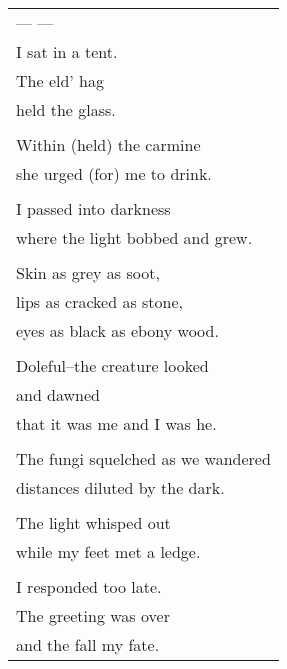 \documentclass{article}
\begin{document}
\begin{tabular}{l}
\\
--- --- \\
I sat in a tent. \\
The eld' hag \\
held the glass. \\
\\
Within (held) the carmine \\
she urged (for) me to drink. \\
\\
I passed into darkness \\
where the light bobbed and grew. \\
\\
Skin as grey as soot, \\
lips as cracked as stone, \\
eyes as black as ebony wood. \\
\\
Doleful--the creature looked \\
and dawned \\
that it was me and I was he. \\
\\
The fungi squelched as we wandered \\
distances diluted by the dark. \\
\\
The light whisped out \\
while my feet met a ledge. \\
\\
I responded too late. \\
The greeting was over \\
and the fall my fate. \\
\end{tabular} \\
\end{document}
